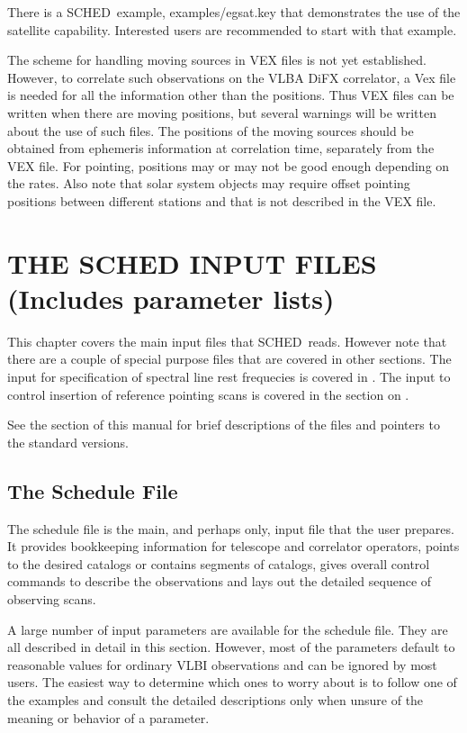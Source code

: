 \documentclass{report}
\newcommand{\schedb}{{\sc SCHED~}}
\begin{document}
There is a \schedb example, 
{examples/egsat.key} that demonstrates the use of the satellite
capability.  Interested users are recommended to start with that
example.

The scheme for handling moving sources in VEX files is not yet established.
However, to correlate such observations on the VLBA DiFX correlator,
a Vex file is needed for all the information other than the positions.
Thus VEX files can be written when there are moving positions, but several
warnings will be written about the use of such files.  The positions
of the moving sources should be obtained from ephemeris information at
correlation time, separately from the VEX file.  For pointing, positions
may or may not be good enough depending on the rates.  Also note that
solar system objects may require offset pointing positions between
different stations and that is not described in the VEX file.


\chapter{\label{CHP:INPUT}THE SCHED INPUT FILES (Includes parameter lists)}

This chapter covers the main input files that \schedb reads.
However note that there are a couple of special purpose files
that are covered in other sections.  The input for specification
of spectral line rest frequecies is covered in
.
The input to control insertion of reference pointing scans is
covered in the section on .

See the \htmlref{\schedb Input and Output Files}{SEC:FILES} section of
this manual for brief descriptions of the files and pointers to the
standard versions.


\section{\label{SEC:SCHPAR}The Schedule File}

The schedule file is the main, and perhaps only, input file that the
user prepares.  It provides bookkeeping information for telescope
and correlator operators, points to the desired catalogs or contains
segments of catalogs, gives overall control commands to describe
the observations and lays out the detailed sequence of observing
scans.

A large number of input parameters are available for the schedule
file.  They are all described in detail in this section.  However,
most of the parameters default to reasonable values for ordinary
VLBI observations and can be ignored by most users.  The easiest
way to determine which ones to worry about is to follow one of
the examples and consult the detailed descriptions only when unsure
of the meaning or behavior of a parameter.
\end{document}
